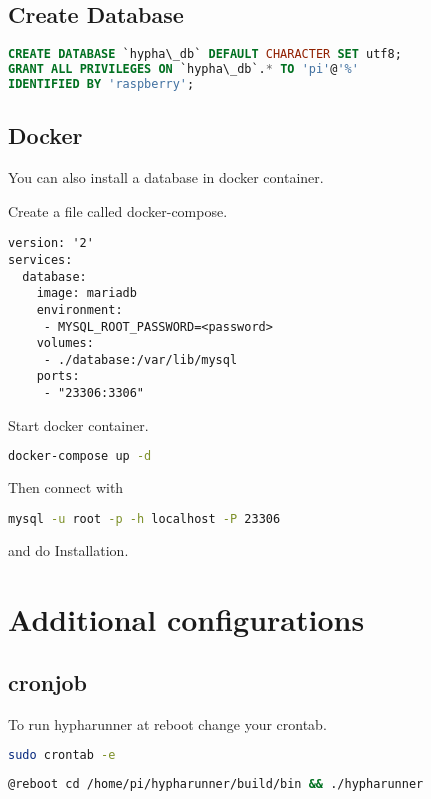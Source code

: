 \documentclass[a4paper,11pt]{report}
\begin{document}
\section{Create Database}
\begin{lstlisting}[language=sql,caption={create database}]
CREATE DATABASE `hypha\_db` DEFAULT CHARACTER SET utf8;
GRANT ALL PRIVILEGES ON `hypha\_db`.* TO 'pi'@'%'
IDENTIFIED BY 'raspberry';
\end{lstlisting}

\section{Docker}

You can also install a database in docker container.

Create a file called docker-compose.

\begin{lstlisting}[language=docker-compose-2,caption={docker-compose.yml},breaklines=true,label={code:compose}]
version: '2'
services:
  database:
    image: mariadb
    environment:
     - MYSQL_ROOT_PASSWORD=<password>
    volumes:
     - ./database:/var/lib/mysql
    ports:
     - "23306:3306"
\end{lstlisting}

Start docker container.

\begin{lstlisting}[language=bash,caption={start database container}]
docker-compose up -d
\end{lstlisting}


Then connect with

\begin{lstlisting}[language=bash,caption={login to remote mysql}]
mysql -u root -p -h localhost -P 23306
\end{lstlisting}

and do Installation.

\chapter{Additional configurations}
\section{cronjob}
To run hypharunner at reboot change your crontab.
\begin{lstlisting}[language=bash]
sudo crontab -e
\end{lstlisting}
\begin{lstlisting}[language=bash,caption={crontab}]
@reboot cd /home/pi/hypharunner/build/bin && ./hypharunner
\end{lstlisting}
\end{document}
